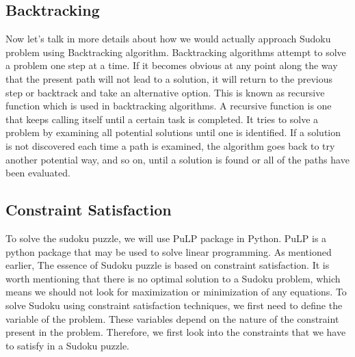 
\subsection{Backtracking}
Now let’s talk in more details about how we would actually approach Sudoku problem using Backtracking algorithm. Backtracking algorithms attempt to solve a problem one step at a time. If it becomes obvious at any point along the way that the present path will not lead to a solution, it will return to the previous step or backtrack and take an alternative option. 
This is known as recursive function which is used in backtracking algorithms. A recursive function is one that keeps calling itself until a certain task is completed. It tries to solve a problem by examining all potential solutions until one is identified. If a solution is not discovered each time a path is examined, the algorithm goes back to try another potential way, and so on, until a solution is found or all of the paths have been evaluated.

\subsection{Constraint Satisfaction}
To solve the sudoku puzzle, we will use PuLP package in Python.
PuLP is a python package that may be used to solve linear programming. As mentioned earlier, The essence of Sudoku puzzle is based on constraint satisfaction. It is worth mentioning that there is no optimal solution to a Sudoku problem, which means we should not look for maximization or minimization of any equations.
To solve Sudoku using constraint satisfaction techniques, we first need to define the variable of the problem. These variables depend on the nature of the constraint present in the problem. Therefore, we first look into the constraints that we have to satisfy in a Sudoku puzzle.

